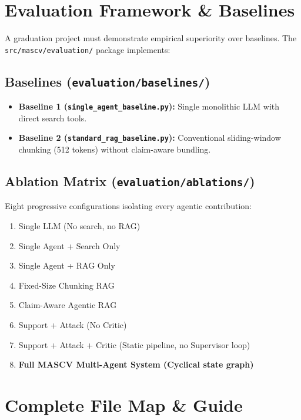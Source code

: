 \documentclass[11pt,a4paper]{article}
\begin{document}
\section{Evaluation Framework \& Baselines}

A graduation project must demonstrate empirical superiority over baselines. The \texttt{src/mascv/evaluation/} package implements:

\subsection{Baselines (\texttt{evaluation/baselines/})}
\begin{itemize}[leftmargin=*]
    \item \textbf{Baseline 1 (\texttt{single\_agent\_baseline.py}):} Single monolithic LLM with direct search tools.
    \item \textbf{Baseline 2 (\texttt{standard\_rag\_baseline.py}):} Conventional sliding-window chunking (512 tokens) without claim-aware bundling.
\end{itemize}

\subsection{Ablation Matrix (\texttt{evaluation/ablations/})}
Eight progressive configurations isolating every agentic contribution:
\begin{enumerate}
    \item Single LLM (No search, no RAG)
    \item Single Agent + Search Only
    \item Single Agent + RAG Only
    \item Fixed-Size Chunking RAG
    \item Claim-Aware Agentic RAG
    \item Support + Attack (No Critic)
    \item Support + Attack + Critic (Static pipeline, no Supervisor loop)
    \item \textbf{Full MASCV Multi-Agent System (Cyclical state graph)}
\end{enumerate}

\section{Complete File Map \& Guide}
\end{document}
